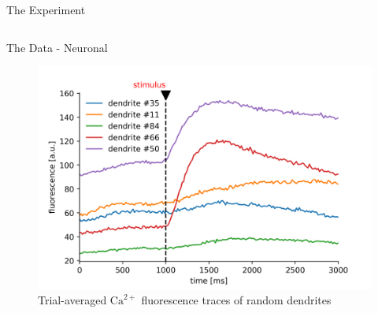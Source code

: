 \documentclass[10pt]{beamer}
\begin{document}
\begin{frame}[fragile]{The Experiment}
\begin{columns}[T,onlytextwidth]

  \end{columns}
\end{frame}

\begin{frame}[fragile]{The Data - Neuronal}
	\begin{center}
	\begin{figure}
	\caption*{Trial-averaged $\text{Ca}^{2+}$ fluorescence traces of random dendrites}
      \includegraphics[width=\textwidth]{traces.png}
	\end{figure}
	\end{center}
\end{frame}
\end{document}

